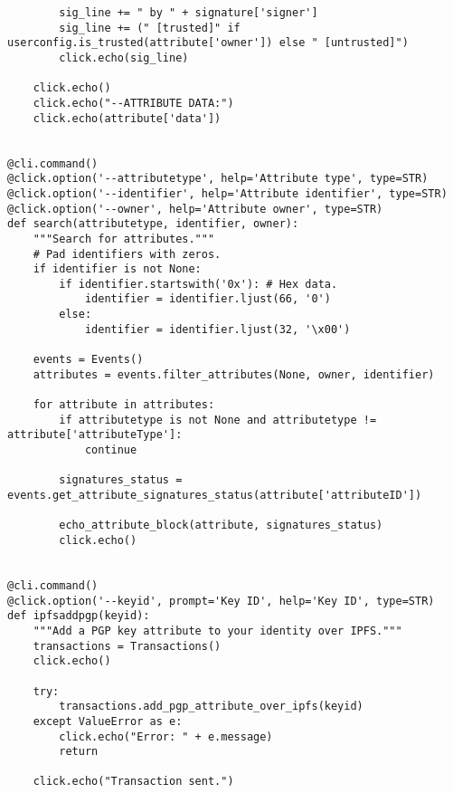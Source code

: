 \documentclass[12pt]{report}
\begin{document}
\begin{lstlisting}
        sig_line += " by " + signature['signer']
        sig_line += (" [trusted]" if userconfig.is_trusted(attribute['owner']) else " [untrusted]")
        click.echo(sig_line)

    click.echo()
    click.echo("--ATTRIBUTE DATA:")
    click.echo(attribute['data'])


@cli.command()
@click.option('--attributetype', help='Attribute type', type=STR)
@click.option('--identifier', help='Attribute identifier', type=STR)
@click.option('--owner', help='Attribute owner', type=STR)
def search(attributetype, identifier, owner):
    """Search for attributes."""
    # Pad identifiers with zeros.
    if identifier is not None:
        if identifier.startswith('0x'): # Hex data.
            identifier = identifier.ljust(66, '0')
        else:
            identifier = identifier.ljust(32, '\x00')

    events = Events()
    attributes = events.filter_attributes(None, owner, identifier)

    for attribute in attributes:
        if attributetype is not None and attributetype != attribute['attributeType']:
            continue

        signatures_status = events.get_attribute_signatures_status(attribute['attributeID'])

        echo_attribute_block(attribute, signatures_status)
        click.echo()


@cli.command()
@click.option('--keyid', prompt='Key ID', help='Key ID', type=STR)
def ipfsaddpgp(keyid):
    """Add a PGP key attribute to your identity over IPFS."""
    transactions = Transactions()
    click.echo()

    try:
        transactions.add_pgp_attribute_over_ipfs(keyid)
    except ValueError as e:
        click.echo("Error: " + e.message)
        return

    click.echo("Transaction sent.")
	\end{lstlisting}
	
\end{document}
